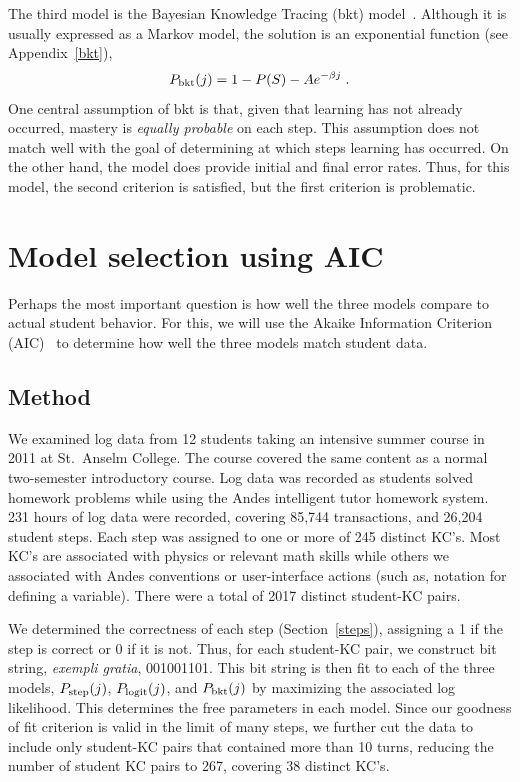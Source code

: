 \documentclass[11pt,letterpaper]{article}
\begin{document}
The third model is the Bayesian Knowledge Tracing (bkt) model~\cite{anderson}.
Although it is usually expressed as a Markov model, the solution
is an exponential function (see Appendix~\ref{bkt}),
%
\begin{equation}
         P_{\rm bkt}(j) = 1-P(S) -A e^{-\beta j} \; .
\end{equation}
%
One central assumption of bkt is that, given that learning
has not already occurred, mastery is {\em equally probable} on each step.
This assumption does not match well with the goal of
determining at which steps learning has occurred.
On the other hand, the model does provide initial and final
error rates.  Thus, for this model, the second criterion is 
satisfied, but the first criterion is problematic.

\section{Model selection using AIC}
\label{model-selection}

Perhaps the most important question is how well the three
models compare to actual student behavior.  For this, we
will use the Akaike Information Criterion (AIC)~\cite{akaike,aicbook}
to determine how well the three models match student data.

\subsection{Method}

We examined log data from 12 students taking an intensive
summer course in 2011 at St.\ Anselm College.  The course
covered the same content as a normal two-semester introductory
course.  Log data was recorded as students solved homework 
problems while using the Andes intelligent tutor homework system.
231 hours of log data were recorded, covering 85,744 transactions,
and 26,204 student steps.  Each step was assigned to one or more
of 245 distinct KC's.  Most KC's are associated with physics
or relevant math skills while others we associated with 
Andes conventions or user-interface actions (such as, notation
for defining a variable).  There were a total of 2017 distinct
student-KC pairs.

We determined the correctness of each step (Section~\ref{steps}),
assigning a 1 if the step is correct or 0 if it is not.
Thus, for each student-KC pair, we construct bit string, {\em exempli gratia},
001001101.  This bit string is then fit to each of the three models,
$P_{\rm step}(j)$, $P_{\rm logit}(j)$, and $P_{\rm bkt}(j)$ by
maximizing the associated log likelihood.  This determines
the free parameters in each model.  Since our goodness of fit
criterion is valid in the limit of many steps, we 
further cut the data to include only student-KC pairs that
contained more than 10 turns, reducing the number of student KC
pairs to 267, covering 38 distinct KC's.
\end{document}
